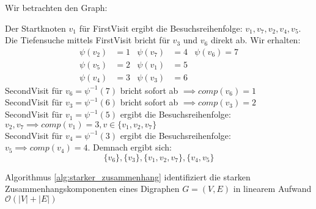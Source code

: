\begin{example}
Wir betrachten den Graph:
\begin{center}
\begin{tikzpicture}

\end{tikzpicture}
\end{center}
Der Startknoten $v_1$ für FirstVisit ergibt die Besuchsreihenfolge: $v_1,v_7,v_2,v_4,v_5$.
Die Tiefensuche mittels FirstVisit bricht für $v_3$ und $v_6$ direkt ab.
Wir erhalten:
\begin{align*}
	\psi(v_2)&=1 & \psi(v_7) &=4 & \psi(v_6)=7 \\
	\psi(v_5)&=2 & \psi(v_1)&=5 \\
	\psi(v_4)&=3 & \psi(v_3)&=6
\end{align*}
SecondVisit für $v_6= \psi^{-1}(7) $ bricht sofort ab $\implies comp(v_6)=1$ \\
SecondVisit für $v_3=\psi^{-1}(6) $ bricht sofort ab $\implies comp(v_3)=2$\\
SecondVisit für $v_1=\psi^{-1}(5)$ ergibt die Besuchsreihenfolge: $v_2,v_7 \implies comp(v_1)=3, v \in \{v_1,v_2,v_7\} $ \\
SecondVisit für $v_4= \psi^{-1}(3)$ ergibt die Besuchsreihenfolge: $v_5 \implies comp(v_4)=4$. 
Demnach ergibt sich:
\[
\{v_6\} , \{v_3\} , \{v_1,v_2,v_7\} , \{v_4,v_5\} 
\]
\end{example}
\begin{theorem}
	Algorithmus \ref{alg:starker_zusammenhang} identifiziert die starken Zusammenhangskomponenten eines Digraphen $G=(V,E)$ in linearem Aufwand $\mathcal{O}(|V|+|E|)$
\end{theorem}
